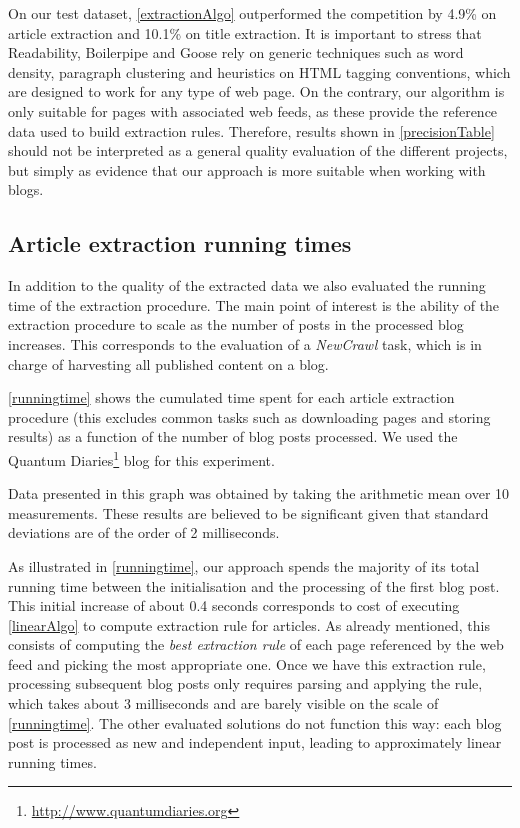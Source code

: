 \precisionTable

On our test dataset, \autoref{extractionAlgo} outperformed the competition by 4.9\% on article extraction and 10.1\% on title extraction. It is important to stress that Readability, Boilerpipe and Goose rely on generic techniques such as word density, paragraph clustering and heuristics on HTML tagging conventions, which are designed to work for any type of web page. On the contrary, our algorithm is only suitable for pages with associated web feeds, as these provide the reference data used to build extraction rules. Therefore, results shown in \autoref{precisionTable} should not be interpreted as a general quality evaluation of the different projects, but simply as evidence that our approach is more suitable when working with blogs.


\subsection{Article extraction running times}

In addition to the quality of the extracted data we also evaluated the running time of the extraction procedure. The main point of interest is the ability of the extraction procedure to scale as the number of posts in the processed blog increases. This corresponds to the evaluation of a \emph{NewCrawl} task, which is in charge of harvesting all published content on a blog.

\autoref{runningtime} shows the cumulated time spent for each article extraction procedure (this excludes common tasks such as downloading pages and storing results) as a function of the number of blog posts processed. We used the Quantum Diaries\footnote{\url{http://www.quantumdiaries.org}} blog for this experiment.

Data presented in this graph was obtained by taking the arithmetic mean over 10 measurements. These results are believed to be significant given that standard deviations are of the order of 2 milliseconds.



As illustrated in \autoref{runningtime}, our approach spends the majority of its total running time between the initialisation and the processing of the first blog post. This initial increase of about 0.4 seconds corresponds to cost of executing \autoref{linearAlgo} to compute extraction rule for articles. As already mentioned, this consists of computing the \emph{best extraction rule} of each page referenced by the web feed and picking the most appropriate one. Once we have this extraction rule, processing subsequent blog posts only requires parsing and applying the rule, which takes about 3 milliseconds and are barely visible on the scale of \autoref{runningtime}. The other evaluated solutions do not function this way: each blog post is processed as new and independent input, leading to approximately linear running times.

